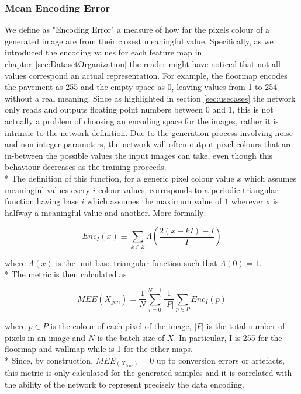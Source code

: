\subsubsection{Mean Encoding Error}
We define as "Encoding Error" a measure of how far the pixels colour of a generated image are from their closest meaningful value. Specifically, as we introduced the encoding values for each feature map in chapter~\ref{sec:DatasetOrganization} the reader might have noticed that not all values correspond an actual representation. For example, the \gls{floormap} encodes the pavement as 255 and the empty space as 0, leaving values from 1 to 254 without a real meaning. Since as highlighted in section \ref{sec:usecases} the network only reads and outputs floating point numbers between 0 and 1, this is not actually a problem of choosing an encoding space for the images, rather it is intrinsic to the network definition. Due to the generation process involving noise and non-integer parameters, the network will often output pixel colours that are in-between the possible values the input images can take, even though this behaviour decreases as the training proceeds. \\*
The definition of this function, for a generic pixel colour value $x$ which assumes meaningful values every $i$ colour values, corresponds to a periodic triangular function having base $i$ which assumes the maximum value of $1$ wherever x is halfway a meaningful value and another. More formally:

	\begin{equation}
	Enc_{I}(x) \equiv \sum_{k \in Z} \Lambda (\frac{2(x-kI)-I}{I})
	\end{equation}
	

where $ \Lambda(x) $ is the unit-base triangular function such that $ \Lambda(0) = 1 $. \\*
The metric is then calculated as 

\begin{equation}
MEE(X_{gen}) = \frac{1}{N}\sum_{i=0}^{N-1} \frac{1}{|P|} \sum_{p\in P} Enc_I(p)
\end{equation}

where $p\in P$ is the colour of each pixel of the image, $|P|$ is the total number of pixels in an image and $N$ is the batch size of $X$. In particular, I is 255 for the \gls{floormap} and \gls{wallmap} while is 1 for the other maps.  \\*
Since, by construction, $MEE_(X_{true}) = 0$ up to conversion errors or artefacts, this metric is only calculated for the generated samples and it is correlated with the ability of the network to represent precisely the data encoding.

